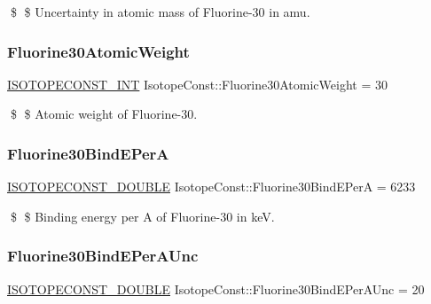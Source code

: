 \$ \$ Uncertainty in atomic mass of Fluorine-\/30 in amu. \mbox{\label{group___isotope_const-_fluorine-_f30_ga2f4d2902ff874d109096e1e7e1546176}} 
\subsubsection{\texorpdfstring{Fluorine30\+Atomic\+Weight}{Fluorine30AtomicWeight}}
{\footnotesize\ttfamily \mbox{\hyperlink{group___isotope_const-_macros_ga5f18360b3e99483a35c32d789e62621c}{I\+S\+O\+T\+O\+P\+E\+C\+O\+N\+S\+T\+\_\+\+I\+NT}} Isotope\+Const\+::\+Fluorine30\+Atomic\+Weight = 30}

\$ \$ Atomic weight of Fluorine-\/30. \mbox{\label{group___isotope_const-_fluorine-_f30_gac26230a6e05b16419f04b29bd52f7166}} 
\subsubsection{\texorpdfstring{Fluorine30\+Bind\+E\+PerA}{Fluorine30BindEPerA}}
{\footnotesize\ttfamily \mbox{\hyperlink{group___isotope_const-_macros_ga8f45a7272ce02c0b4c65c44636ed719a}{I\+S\+O\+T\+O\+P\+E\+C\+O\+N\+S\+T\+\_\+\+D\+O\+U\+B\+LE}} Isotope\+Const\+::\+Fluorine30\+Bind\+E\+PerA = 6233}

\$ \$ Binding energy per A of Fluorine-\/30 in keV. \mbox{\label{group___isotope_const-_fluorine-_f30_ga2bad0e97933f91714fd0708cdd07e9ab}} 
\subsubsection{\texorpdfstring{Fluorine30\+Bind\+E\+Per\+A\+Unc}{Fluorine30BindEPerAUnc}}
{\footnotesize\ttfamily \mbox{\hyperlink{group___isotope_const-_macros_ga8f45a7272ce02c0b4c65c44636ed719a}{I\+S\+O\+T\+O\+P\+E\+C\+O\+N\+S\+T\+\_\+\+D\+O\+U\+B\+LE}} Isotope\+Const\+::\+Fluorine30\+Bind\+E\+Per\+A\+Unc = 20}

